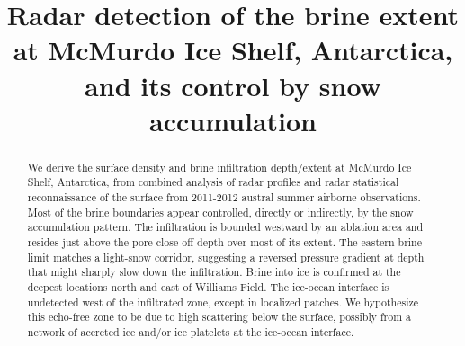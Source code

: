 \documentclass[draft,grl]{agutex}
\begin{document}



%
%


\title{Radar detection of the brine extent at McMurdo Ice Shelf, Antarctica, and its control by snow accumulation}

%
%



%
%

\begin{abstract}
We derive the surface density and brine infiltration depth/extent at McMurdo Ice Shelf, Antarctica, from combined analysis of radar profiles and radar statistical reconnaissance of the surface from 2011-2012 austral summer airborne observations. Most of the brine boundaries appear controlled, directly or indirectly, by the snow accumulation pattern. The infiltration is bounded westward by an ablation area and resides just above the pore close-off depth over most of its extent. The eastern brine limit matches a light-snow corridor, suggesting a reversed pressure gradient at depth that might sharply slow down the infiltration. Brine into ice is confirmed at the deepest locations north and east of Williams Field. The ice-ocean interface is undetected west of the infiltrated zone, except in localized patches. We hypothesize this echo-free zone to be due to high scattering below the surface, possibly from a network of accreted ice and/or ice platelets at the ice-ocean interface.
\end{abstract}
\end{document}
